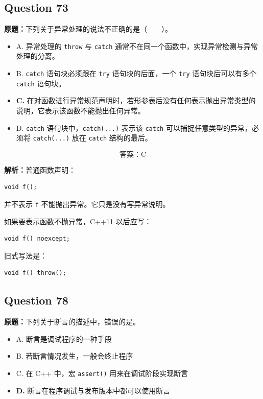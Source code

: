 \documentclass[11pt, a4paper]{article}
\begin{document}

\subsection*{Question 73}
\textbf{原题：}下列关于异常处理的说法不正确的是（~~~~）。
\begin{itemize}
    \item A. 异常处理的 \texttt{throw} 与 \texttt{catch} 通常不在同一个函数中，实现异常检测与异常处理的分离。
    \item B. \texttt{catch} 语句块必须跟在 \texttt{try} 语句块的后面，一个 \texttt{try} 语句块后可以有多个 \texttt{catch} 语句块。
    \item \textbf{C.} 在对函数进行异常规范声明时，若形参表后没有任何表示抛出异常类型的说明，它表示该函数不能抛出任何异常。
    \item D. \texttt{catch} 语句块中，\texttt{catch(...)} 表示该 \texttt{catch} 可以捕捉任意类型的异常，必须将 \texttt{catch(...)} 放在 \texttt{catch} 结构的最后。
\end{itemize}

\[
\boxed{\text{答案：C}}
\]

\textbf{解析：}普通函数声明：
\begin{lstlisting}
void f();
\end{lstlisting}
并不表示 \texttt{f} 不能抛出异常。它只是没有写异常说明。

如果要表示函数不抛异常，C++11 以后应写：
\begin{lstlisting}
void f() noexcept;
\end{lstlisting}
旧式写法是：
\begin{lstlisting}
void f() throw();
\end{lstlisting}


\subsection*{Question 78}
\textbf{原题：}下列关于断言的描述中，错误的是。
\begin{itemize}
    \item A. 断言是调试程序的一种手段
    \item B. 若断言情况发生，一般会终止程序
    \item C. 在 C++ 中，宏 \texttt{assert()} 用来在调试阶段实现断言
    \item \textbf{D.} 断言在程序调试与发布版本中都可以使用断言
\end{itemize}
\end{document}
